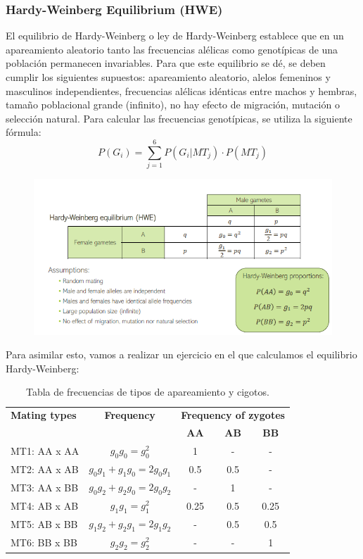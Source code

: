 \subsubsection{Hardy-Weinberg Equilibrium (HWE)}
El equilibrio de Hardy-Weinberg o ley de Hardy-Weinberg establece que en un apareamiento aleatorio tanto las frecuencias alélicas como genotípicas de una población permanecen invariables. Para que este equilibrio se dé, se deben cumplir los siguientes supuestos: apareamiento aleatorio, alelos femeninos y masculinos independientes, frecuencias alélicas idénticas entre machos y hembras, tamaño poblacional grande (infinito), no hay efecto de migración, mutación o selección natural. Para calcular las frecuencias genotípicas, se utiliza la siguiente fórmula:
$$P(G_i) = \sum_{j=1}^6 P(G_i|MT_j) \cdot P(MT_j)$$

\begin{figure}[htbp]
\centering
\includegraphics[width = \textwidth]{figs/hwe.png}
\end{figure}

Para asimilar esto, vamos a realizar un ejercicio en el que calculamos el equilibrio Hardy-Weinberg:
\begin{table}[h!]
\centering
\begin{tabular}{|l|c|ccc|}
\hline
\textbf{Mating types} & \textbf{Frequency} & \multicolumn{3}{c|}{\textbf{Frequency of zygotes}} \\ 
\cline{3-5}
                      &                    & \textbf{AA} & \textbf{AB} & \textbf{BB} \\ \hline
MT1: AA x AA          & $g_0g_0 = g_0^2$   & 1           & -           & -           \\
MT2: AA x AB          & $g_0g_1+g_1g_0 = 2g_0g_1$ & 0.5         & 0.5         & -           \\
MT3: AA x BB          & $g_0g_2 + g_2g_0= 2g_0g_2$ & -           & 1           & -           \\
MT4: AB x AB          & $g_1g_1 = g_1^2$   & 0.25        & 0.5         & 0.25        \\
MT5: AB x BB          & $g_1g_2+g_2g_1 = 2g_1g_2$ & -           & 0.5         & 0.5         \\
MT6: BB x BB          & $g_2g_2 = g_2^2$   & -           & -           & 1           \\ \hline
\end{tabular}
\caption{Tabla de frecuencias de tipos de apareamiento y cigotos.}
\label{tab:zygotes}
\end{table}

